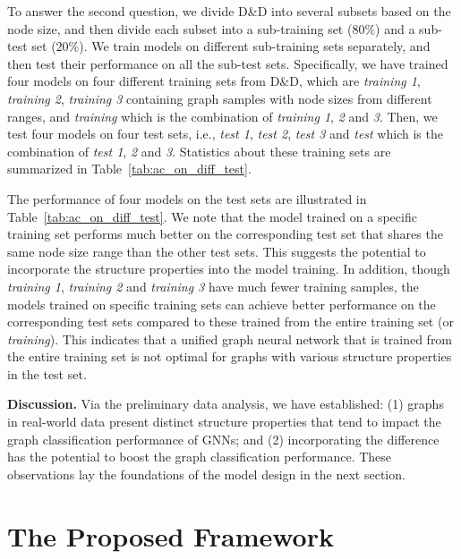 \documentclass[11pt,dvipdfm]{article}
\begin{document}
To answer the second question, we divide D\&D into several subsets based on the node size, and then divide each subset into a sub-training set ($80\%$) and a sub-test set ($20\%$). We train models on different sub-training sets separately, and then test their performance on all the sub-test sets. 
Specifically, we have trained four models on four different training sets from D\&D, which are {\it training 1}, {\it training 2}, {\it training 3} containing graph samples with node sizes from different ranges, and {\it training} which is the combination of {\it training 1}, {\it 2} and {\it 3}. 
Then, we test four models on four test sets, i.e., {\it test 1}, {\it test 2}, {\it test 3} and {\it test} which is the combination of {\it test 1}, {\it 2} and {\it 3}. Statistics about these training sets are summarized in Table~\ref{tab:ac_on_diff_test}.

The performance of four models on the test sets are illustrated in Table~\ref{tab:ac_on_diff_test}. 
We note that the model trained on a specific training set performs much better on the corresponding test set that shares the same node size range than the other test sets. This suggests the potential to incorporate the structure properties into the model training. 
In addition, though {\it training 1}, {\it training 2} and {\it training 3}  have much fewer training samples, the models trained on specific training sets can achieve better performance on the corresponding test sets compared to these trained from the entire training set (or {\it training}). 
This indicates that a unified graph neural network that is trained from the entire training set is not optimal for graphs with various structure properties in the test set.


{\textbf{Discussion.}} Via the preliminary data analysis, we have established: (1) graphs in real-world data present distinct structure properties that tend to impact the graph classification performance of GNNs; and (2) incorporating the difference has the potential to boost the graph classification performance.  These observations lay the foundations of the model design in the next section.  


\section{The Proposed Framework}\label{sec:yiqi_model}
\end{document}

